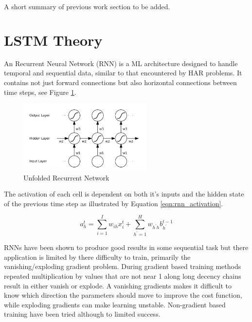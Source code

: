 \documentclass[sensors,article,submit,moreauthors,pdftex]{Definitions/mdpi}
\begin{document}
A short summary of previous work section to be added.


\section{LSTM Theory} 
\label{sec:lstm_therory}
An Recurrent Neural Network (RNN) is a ML architecture designed to handle temporal and sequential data, similar to that encountered by HAR problems. It contains not just forward connections but also horizontal connections between time steps, see Figure \ref{fig:rnn_structure}.

\begin{figure}[!hbt]
    \centering
    \includegraphics[width=0.6\textwidth]{Figures/lstm/rnn_structure.png}
    \caption{Unfolded Recurrent Network\cite{Graves2012}}
    \label{fig:rnn_structure}
\end{figure}

The activation of each cell is dependent on both it's inputs and the hidden state of the previous time step as illustrated by Equation \ref{eqn:rnn_activation}.\cite{Graves2012}

\begin{equation}
    a_h^t = \sum_{i=1}^I w_{ih}x^t_i + \sum_{h^\prime=1}^H w_{h^\prime h} b_{h^\prime}^{t-1}
    \label{eqn:rnn_activation}
\end{equation}

RNNs have been shown to produce good results in some sequential task but there application is limited by there difficulty to train, primarily the vanishing/exploding gradient problem. During gradient based training methods repeated multiplication by values that are not near 1 along long decency chains result in either vanish or explode. A vanishing gradients makes it difficult to know which direction the parameters should move to improve the cost function, while exploding gradients can make learning unstable. Non-gradient based training have been tried although to limited success. \cite{Graves2012, Goodfellow2015}
\end{document}

